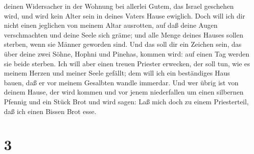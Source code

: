deinen Widersacher in der Wohnung bei allerlei Gutem, das Israel
geschehen wird, und wird kein Alter sein in deines Vaters Hause
ewiglich.  Doch will ich dir nicht einen jeglichen von
meinem Altar ausrotten, auf daß deine Augen verschmachten und deine
Seele sich gräme; und alle Menge deines Hauses sollen sterben, wenn sie
Männer geworden sind.  Und das soll dir ein Zeichen sein,
das über deine zwei Söhne, Hophni und Pinehas, kommen wird: auf einen
Tag werden sie beide sterben.  Ich will aber einen treuen
Priester erwecken, der soll tun, wie es meinem Herzen und meiner Seele
gefällt; dem will ich ein beständiges Haus bauen, daß er vor meinem
Gesalbten wandle immerdar.  Und wer übrig ist von deinem
Hause, der wird kommen und vor jenem niederfallen um einen silbernen
Pfennig und ein Stück Brot und wird sagen: Laß mich doch zu einem
Priesterteil, daß ich einen Bissen Brot esse.

\hypertarget{section-2}{%
\section{3}\label{section-2}}

